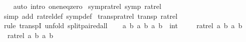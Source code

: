 \begin{isabellebody}
%
\isadelimproof
\ \ %
\endisadelimproof
%
\isatagproof
{}\isamarkupfalse%
\ {\isacharparenleft}{\kern0pt}auto\ intro{\isacharbang}{\kern0pt}{\isacharcolon}{\kern0pt}\ one{\isacharunderscore}{\kern0pt}neq{\isacharunderscore}{\kern0pt}zero{\isacharparenright}{\kern0pt}%
\endisatagproof
{\isafoldproof}%
%
\isadelimproof
\isanewline
%
\endisadelimproof
\isanewline
{}\isamarkupfalse%
\ symp{\isacharunderscore}{\kern0pt}ratrel{\isacharcolon}{\kern0pt}\ {\isachardoublequoteopen}symp\ ratrel{\isachardoublequoteclose}\isanewline
%
\isadelimproof
\ \ %
\endisadelimproof
%
\isatagproof
{}\isamarkupfalse%
\ {\isacharparenleft}{\kern0pt}simp\ add{\isacharcolon}{\kern0pt}\ ratrel{\isacharunderscore}{\kern0pt}def\ symp{\isacharunderscore}{\kern0pt}def{\isacharparenright}{\kern0pt}%
\endisatagproof
{\isafoldproof}%
%
\isadelimproof
\isanewline
%
\endisadelimproof
\isanewline
{}\isamarkupfalse%
\ transp{\isacharunderscore}{\kern0pt}ratrel{\isacharcolon}{\kern0pt}\ {\isachardoublequoteopen}transp\ ratrel{\isachardoublequoteclose}\isanewline
%
\isadelimproof
%
\endisadelimproof
%
\isatagproof
{}\isamarkupfalse%
\ {\isacharparenleft}{\kern0pt}rule\ transpI{\isacharcomma}{\kern0pt}\ unfold\ split{\isacharunderscore}{\kern0pt}paired{\isacharunderscore}{\kern0pt}all{\isacharparenright}{\kern0pt}\isanewline
\ \ \isamarkupfalse%
\ a\ b\ a{\isacharprime}{\kern0pt}\ b{\isacharprime}{\kern0pt}\ a{\isacharprime}{\kern0pt}{\isacharprime}{\kern0pt}\ b{\isacharprime}{\kern0pt}{\isacharprime}{\kern0pt}\ {\isacharcolon}{\kern0pt}{\isacharcolon}{\kern0pt}\ int\isanewline
\ \ \isamarkupfalse%
\ {\isacharasterisk}{\kern0pt}{\isacharcolon}{\kern0pt}\ {\isachardoublequoteopen}ratrel\ {\isacharparenleft}{\kern0pt}a{\isacharcomma}{\kern0pt}\ b{\isacharparenright}{\kern0pt}\ {\isacharparenleft}{\kern0pt}a{\isacharprime}{\kern0pt}{\isacharcomma}{\kern0pt}\ b{\isacharprime}{\kern0pt}{\isacharparenright}{\kern0pt}{\isachardoublequoteclose}\isanewline
\ \ \isamarkupfalse%
\ {\isacharasterisk}{\kern0pt}{\isacharasterisk}{\kern0pt}{\isacharcolon}{\kern0pt}\ {\isachardoublequoteopen}ratrel\ {\isacharparenleft}{\kern0pt}a{\isacharprime}{\kern0pt}{\isacharcomma}{\kern0pt}\ b{\isacharprime}{\kern0pt}{\isacharparenright}{\kern0pt}\ {\isacharparenleft}{\kern0pt}a{\isacharprime}{\kern0pt}{\isacharprime}{\kern0pt}{\isacharcomma}{\kern0pt}\ b{\isacharprime}{\kern0pt}{\isacharprime}{\kern0pt}{\isacharparenright}{\kern0pt}{\isachardoublequoteclose}\isanewline
\ \ \isamarkupfalse%

\end{isabellebody}
